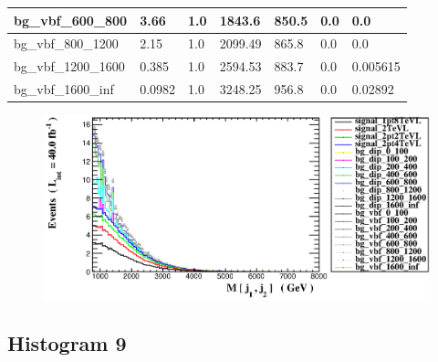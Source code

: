 \documentclass[a4paper, 10pt]{article}
\begin{document}
\begin{table}[H]
\begin{center}
\begin{tabular}{|m{23.0mm}|m{23.0mm}|m{18.0mm}|m{19.0mm}|m{19.0mm}|m{19.0mm}|m{19.0mm}|}
      \hline
      {\cellcolor{white}         bg\_vbf\_600\_800}& {\cellcolor{white}         3.66}& {\cellcolor{white}         1.0}& {\cellcolor{white}         1843.6}& {\cellcolor{white}         850.5}& {\cellcolor{green}         0.0}& {\cellcolor{green}         0.0}\\
      \hline
      {\cellcolor{white}         bg\_vbf\_800\_1200}& {\cellcolor{white}         2.15}& {\cellcolor{white}         1.0}& {\cellcolor{white}         2099.49}& {\cellcolor{white}         865.8}& {\cellcolor{green}         0.0}& {\cellcolor{green}         0.0}\\
      \hline
      {\cellcolor{white}         bg\_vbf\_1200\_1600}& {\cellcolor{white}         0.385}& {\cellcolor{white}         1.0}& {\cellcolor{white}         2594.53}& {\cellcolor{white}         883.7}& {\cellcolor{green}         0.0}& {\cellcolor{green}         0.005615}\\
      \hline
      {\cellcolor{white}         bg\_vbf\_1600\_inf}& {\cellcolor{white}         0.0982}& {\cellcolor{white}         1.0}& {\cellcolor{white}         3248.25}& {\cellcolor{white}         956.8}& {\cellcolor{green}         0.0}& {\cellcolor{green}         0.02892}\\
\hline
    \end{tabular}
  \end{center}
\end{table}

\begin{figure}[H]
  \begin{center}
    \includegraphics[scale=0.45]{selection_7.eps}\\
\caption{   }
  \end{center}
\end{figure}
      \newpage
\subsection{ Histogram 9}
\end{document}
